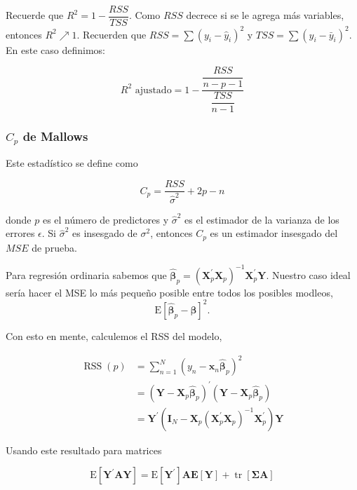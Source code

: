 \documentclass[
  12pt,
]{book}
\begin{document}
Recuerde que \(R^2 = 1 - \dfrac{RSS}{TSS}\). Como \(RSS\) decrece si se
le agrega más variables, entonces \(R^2 \nearrow 1\). Recuerden que
\(RSS = \sum(y_i-\hat{y}_i)^2\) y \(TSS = \sum(y_i-\bar{y}_i)^2\). En
este caso definimos:

\[R^2 \text{ ajustado}= 1-\dfrac{\dfrac{RSS}{n-p-1}}{\dfrac{TSS}{n-1}}\]

\hypertarget{c_p-de-mallows}{%
\subsubsection{\texorpdfstring{\(C_p\) de
Mallows}{C\_p de Mallows}}\label{c_p-de-mallows}}

Este estadístico se define como

\[ C_p = \dfrac{RSS}{\hat\sigma^2} + 2p-n \]

donde \(p\) es el número de predictores y \(\hat\sigma^2\) es el
estimador de la varianza de los errores \(\epsilon\). Si
\(\hat\sigma^2\) es insesgado de \(\sigma^2\), entonces \(C_p\) es un
estimador insesgado del \(MSE\) de prueba.

Para regresión ordinaria sabemos que
\(\hat{\boldsymbol{\beta}}_{p}=\left(\mathbf{X}_{p}^{\prime} \mathbf{X}_{p}\right)^{-1} \mathbf{X}_{p}^{\prime} \mathbf{Y}\).
Nuestro caso ideal sería hacer el MSE lo más pequeño posible entre todos
los posibles modleos, \begin{equation*}
\mathrm{E}\left[\hat{\boldsymbol{\beta}}_{p}-\boldsymbol{\beta}\right]^{2}.
\end{equation*}

Con esto en mente, calculemos el RSS del modelo,

\begin{equation*}
\begin{aligned}
\operatorname{RSS}(p) &=\sum_{n=1}^{N}\left(y_{n}-\mathbf{x}_{n} \hat{\boldsymbol{\beta}}_{p}\right)^{2} \\
&=\left(\mathbf{Y}-\mathbf{X}_{p} \hat{\boldsymbol{\beta}}_{p}\right)^{\prime}\left(\mathbf{Y}-\mathbf{X}_{p} \hat{\boldsymbol{\beta}}_{p}\right) \\
&=\mathbf{Y}^{\prime}\left(\mathbf{I}_{N}-\mathbf{X}_{p}\left(\mathbf{X}_{p}^{\prime} \mathbf{X}_{p}\right)^{-1} \mathbf{X}_{p}^{\prime}\right) \mathbf{Y}
\end{aligned}
\end{equation*}

Usando este resultado para matrices

\begin{equation*}
\mathrm{E}\left[\mathbf{Y}^{\prime} \mathbf{A Y}\right]=\mathrm{E}\left[\mathbf{Y}^{\prime}\right] \mathbf{A E}[\mathbf{Y}]+\operatorname{tr}[\mathbf{\Sigma} \mathbf{A}]
\end{equation*}
\end{document}
